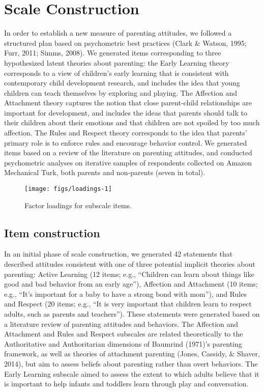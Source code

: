 \documentclass[10pt, letterpaper]{article}
\newenvironment{CodeChunk}{}{}
\begin{document}
\section{Scale Construction}\label{scale-construction}

In order to establish a new measure of parenting attitudes, we followed
a structured plan based on psychometric best practices (Clark \& Watson,
1995; Furr, 2011; Simms, 2008). We generated items corresponding to
three hypothesized latent theories about parenting: the Early Learning
theory corresponds to a view of children's early learning that is
consistent with contemporary child development research, and includes
the idea that young children can teach themselves by exploring and
playing. The Affection and Attachment theory captures the notion that
close parent-child relationships are important for development, and
includes the ideas that parents should talk to their children about
their emotions and that children are not spoiled by too much affection.
The Rules and Respect theory corresponds to the idea that parents'
primary role is to enforce rules and encourage behavior control. We
generated items based on a review of the literature on parenting
attitudes, and conducted psychometric analyses on iterative samples of
respondents collected on Amazon Mechanical Turk, both parents and
non-parents (seven in total).

\begin{CodeChunk}
\begin{figure*}

{\centering \texttt{[image: figs/loadings-1]} 

}

\caption[Factor loadings for subscale items]{Factor loadings for subscale items.}\label{fig:loadings}
\end{figure*}
\end{CodeChunk}

\subsection{Item construction}\label{item-construction}

In an initial phase of scale construction, we generated 42 statements
that described attitudes consistent with one of three potential implicit
theories about parenting: Active Learning (12 items; e.g., ``Children
can learn about things like good and bad behavior from an early age''),
Affection and Attachment (10 items; e.g., ``It's important for a baby to
have a strong bond with mom''), and Rules and Respect (20 items; e.g.,
``It is very important that children learn to respect adults, such as
parents and teachers''). These statements were generated based on a
literature review of parenting attitudes and behaviors. The Affection
and Attachment and Rules and Respect subscales are related theoretically
to the Authoritative and Authoritarian dimensions of Baumrind (1971)'s
parenting framework, as well as theories of attachment parenting (Jones,
Cassidy, \& Shaver, 2014), but aim to assess beliefs about parenting
rather than overt behaviors. The Early Learning subscale aimed to assess
the extent to which adults believe that it is important to help infants
and toddlers learn through play and conversation.
\end{document}
